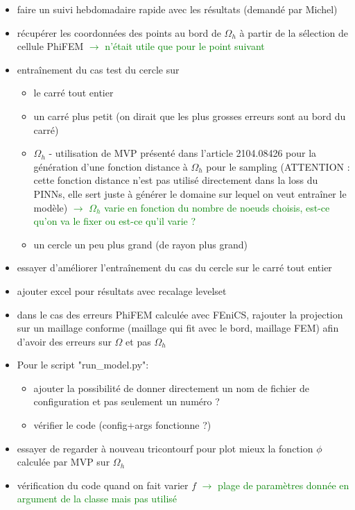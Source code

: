 \begin{itemize}[label=$\square$]
	\item[\done] faire un suivi hebdomadaire rapide avec les résultats (demandé par Michel)
	\item[\wontfix] récupérer les coordonnées des points au bord de $\Omega_h$ à partir de la sélection de cellule PhiFEM \textcolor{Green}{$\rightarrow$ n'était utile que pour le point suivant}
	\item[\later] entraînement du cas test du cercle sur 
	\begin{itemize}[label=\LARGE $\circ$]
		\item[\sdone] le carré tout entier
		\item[\swontfix] un carré plus petit (on dirait que les plus grosses erreurs sont au bord du carré)
		\item[\swontfix] $\Omega_h$ - utilisation de MVP présenté dans l'article 2104.08426 pour la génération d'une fonction distance à $\Omega_h$ pour le sampling (ATTENTION : cette fonction distance n'est pas utilisé directement dans la loss du PINNs, elle sert juste à générer le domaine sur lequel on veut entraîner le modèle) \textcolor{Green}{$\rightarrow$ $\Omega_h$ varie en fonction du nombre de noeuds choisis, est-ce qu'on va le fixer ou est-ce qu'il varie ?}
		\item[\later] un cercle un peu plus grand (de rayon plus grand) 
	\end{itemize}
	\item[\wontfix] essayer d'améliorer l'entraînement du cas du cercle sur le carré tout entier
	\item[\wontfix] ajouter excel pour résultats avec recalage levelset
	\item[\done] dans le cas des erreurs PhiFEM calculée avec FEniCS, rajouter la projection sur un maillage conforme (maillage qui fit avec le bord, maillage FEM) afin d'avoir des erreurs sur $\Omega$ et pas $\Omega_h$
	\item[\done] Pour le script "run\_model.py":
	\begin{itemize}[label=\LARGE $\circ$]
		\item[\swontfix] ajouter la possibilité de donner directement un nom de fichier de configuration et pas seulement un numéro ?
		\item[\sdone] vérifier le code (config+args fonctionne ?)
	\end{itemize}
	\item[\wontfix] essayer de regarder à nouveau tricontourf pour plot mieux la fonction $\phi$ calculée par MVP sur $\Omega_h$
	\item[\done] vérification du code quand on fait varier $f$ \textcolor{Green}{$\rightarrow$ plage de paramètres donnée en argument de la classe mais pas utilisé}

\end{itemize}
